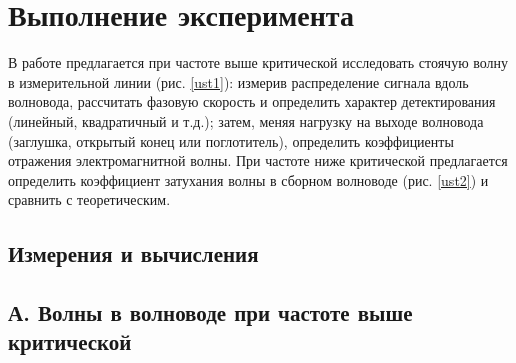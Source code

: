 \documentclass{lab}
\begin{document}
\section*{Выполнение эксперимента}
В работе предлагается при частоте выше критической исследовать
стоячую волну в измерительной линии (рис. \ref{ust1}): измерив распределение
сигнала вдоль волновода, рассчитать фазовую скорость и определить характер
детектирования (линейный, квадратичный и т.д.); затем, меняя
нагрузку на выходе волновода (заглушка, открытый конец или поглотитель),
определить коэффициенты отражения электромагнитной волны. При частоте ниже критической предлагается определить
коэффициент затухания волны в сборном волноводе (рис. \ref{ust2}) и сравнить с теоретическим.
\subsection*{Измерения и вычисления}
\subsection*{А. Волны в волноводе при частоте выше критической}
\end{document}
